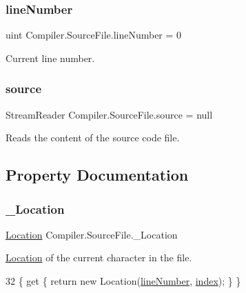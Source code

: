 \subsubsection{\texorpdfstring{line\+Number}{lineNumber}}
{\footnotesize\ttfamily uint Compiler.\+Source\+File.\+line\+Number = 0\hspace{0.3cm}{\ttfamily [private]}}

Current line number. \mbox{\label{class_compiler_1_1_source_file_a46db9fe024d4cf1e282e6afafea8c4b2}} 
\subsubsection{\texorpdfstring{source}{source}}
{\footnotesize\ttfamily Stream\+Reader Compiler.\+Source\+File.\+source = null\hspace{0.3cm}{\ttfamily [private]}}

Reads the content of the source code file. 

\subsection{Property Documentation}
\mbox{\label{class_compiler_1_1_source_file_a9f6feacf9e20b5b1d535c712d9b4370e}} 
\subsubsection{\texorpdfstring{\+\_\+\+Location}{\_Location}}
{\footnotesize\ttfamily \mbox{\hyperlink{class_compiler_1_1_location}{Location}} Compiler.\+Source\+File.\+\_\+\+Location\hspace{0.3cm}{\ttfamily [get]}}

\mbox{\hyperlink{class_compiler_1_1_location}{Location}} of the current character in the file. 
\begin{DoxyCode}
32 \{ \textcolor{keyword}{get} \{ \textcolor{keywordflow}{return} \textcolor{keyword}{new} Location(\mbox{\hyperlink{class_compiler_1_1_source_file_a9fea4fc4a3640f2f88db7d2e8be3db70}{lineNumber}}, \mbox{\hyperlink{class_compiler_1_1_source_file_a46a2996b918f0b2f795449879663cfe5}{index}}); \} \}
\end{DoxyCode}
\mbox{\label{class_compiler_1_1_source_file_a4a0d8f66b3c7de70edadb1761aaf65b5}} 
